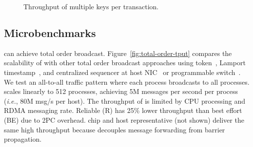 \begin{figure}[t!]
\begin{minipage}{.31\textwidth}
		\centering
		\caption{Throughput of multiple keys per transaction.}
		\label{fig:multishard}
    \end{minipage}
	\hspace{0.01\textwidth}
\vspace{-15pt}
\end{figure}
\fi

\subsection{Microbenchmarks}
\label{sec:microbenchmark}

\sys{} can achieve total order broadcast.
Figure~\ref{fig:total-order-tput} compares the scalability of \sys{} with other total order broadcast approaches using token~\cite{rajagopalan1989token}, Lamport timestamp~\cite{lamport1978time}, and centralized sequencer at host NIC~\cite{kaminsky2016design} or programmable switch~\cite{eris}.
We test an all-to-all traffic pattern where each process broadcasts to all processes.
\sys{} scales linearly to 512 processes, achieving 5M messages per second per process (\textit{i.e.}, 80M msg/s per host).
The throughput of \sys is limited by CPU processing and RDMA messaging rate.
Reliable (R) \sys{} has 25\% lower throughput than best effort (BE) \sys{} due to 2PC overhead. %
 chip and host representative (not shown) deliver the same high throughput because \sys{} decouples message forwarding from barrier propagation.


